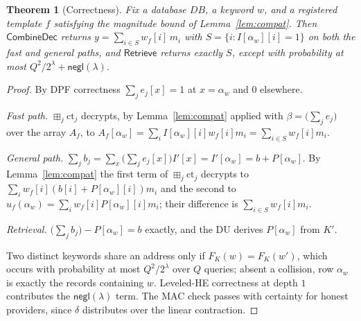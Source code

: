 \documentclass[journal]{IEEEtran}
\newtheorem{theorem}{Theorem}
\newcommand{\negl}{\mathsf{negl}}
\newcommand{\bplus}{\boxplus}
\begin{document}
\begin{theorem}[Correctness]
\label{thm:correct}
Fix a database $DB$, a keyword $w$, and a registered template $f$ satisfying the magnitude bound of Lemma~\ref{lem:compat}. Then $\mathsf{CombineDec}$ returns $y=\sum_{i\in S} w_f[i]\,m_i$ with $S=\{i: I[\alpha_w][i]=1\}$ on both the fast and general paths, and $\mathsf{Retrieve}$ returns exactly $S$, except with probability at most $Q^2/2^{\lambda}+\negl(\lambda)$.
\end{theorem}
\begin{proof}
By DPF correctness $\sum_j e_j[x]=1$ at $x=\alpha_w$ and $0$ elsewhere.

\emph{Fast path.} $\bplus_j\text{ct}_j$ decrypts, by Lemma~\ref{lem:compat} applied with $\beta=\big(\sum_j e_j\big)$ over the array $A_f$, to $A_f[\alpha_w]=\sum_i I[\alpha_w][i]w_f[i]m_i=\sum_{i\in S}w_f[i]m_i$.

\emph{General path.} $\sum_j b_j=\sum_x\big(\sum_j e_j[x]\big) I'[x]=I'[\alpha_w]=b+P[\alpha_w]$. By Lemma~\ref{lem:compat} the first term of $\bplus_j \text{ct}_j$ decrypts to $\sum_i w_f[i](b[i]+P[\alpha_w][i])m_i$ and the second to $u_f(\alpha_w)=\sum_i w_f[i]P[\alpha_w][i]m_i$; their difference is $\sum_{i\in S}w_f[i]m_i$.

\emph{Retrieval.} $\big(\sum_j b_j\big)-P[\alpha_w]=b$ exactly, and the DU derives $P[\alpha_w]$ from $K'$.

Two distinct keywords share an address only if $F_K(w)=F_K(w')$, which occurs with probability at most $Q^2/2^\lambda$ over $Q$ queries; absent a collision, row $\alpha_w$ is exactly the records containing $w$. Leveled-HE correctness at depth $1$ contributes the $\negl(\lambda)$ term. The MAC check passes with certainty for honest providers, since $\delta$ distributes over the linear contraction.
\end{proof}
\end{document}
